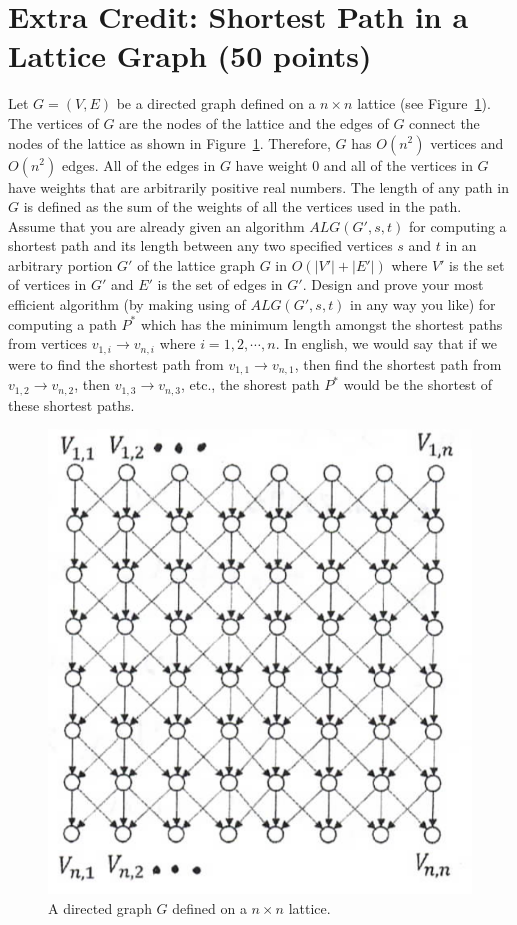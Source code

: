 \documentclass[11pt]{article}
\newcommand{\question}[1]{\section*{\normalsize #1}}
\begin{document}
\question{Extra Credit: Shortest Path in a Lattice Graph (50 points)}
Let $G = (V, E)$ be a directed graph defined on a $n\times n$ lattice (see Figure~\ref{fig:lattice}). The vertices of $G$ are the nodes of the lattice and the edges of $G$ connect the nodes of the lattice as shown in Figure~\ref{fig:lattice}. Therefore, $G$ has $O(n^2)$ vertices and $O(n^2)$ edges. All of the edges in $G$ have weight 0 and all of the vertices in $G$ have weights that are arbitrarily positive real numbers. The length of any path in $G$ is defined as the sum of the weights of all the vertices used in the path. Assume that you are already given an algorithm $ALG(G', s,t)$ for computing a shortest path and its length between any two specified vertices $s$ and $t$ in an arbitrary portion $G'$ of the lattice graph $G$ in $O(|V'| + |E'|)$ where $V'$ is the set of vertices in $G'$ and $E'$ is the set of edges in $G'$. Design and prove your most efficient algorithm (by making using of $ALG(G', s,t)$ in any way you like) for computing a path $P^*$ which has the minimum length amongst the shortest paths from vertices $v_{1, i}\rightarrow v_{n,i}$ where $i=1,2,\cdots,n$. In english, we would say that if we were to find the shortest path from $v_{1,1}\rightarrow v_{n,1}$, then find the shortest path from $v_{1,2}\rightarrow v_{n,2}$, then $v_{1,3}\rightarrow v_{n,3}$, etc., the shorest path $P^*$ would be the shortest of these shortest paths.
\begin{figure}[!h]
    \centering
    \includegraphics[width=0.5\linewidth]{./imgs/lattice.png}
    \caption{A directed graph $G$ defined on a $n\times n$ lattice.}
    \label{fig:lattice}
\end{figure}
\end{document}

